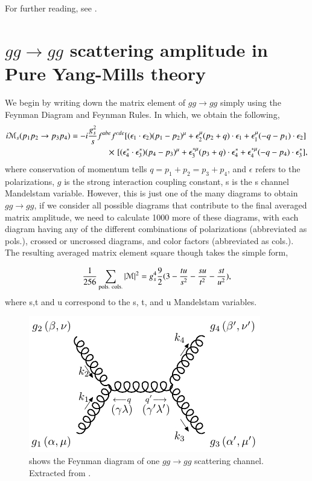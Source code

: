 \documentclass{article}
\begin{document}
\begin{appendices}
  For further reading, see \cite{schwartz2014quantum}. 

\section{$gg \to gg$ scattering amplitude in Pure Yang-Mills theory}%
  \label{sec:$gg \to gg$ scattering amplitude in Pure Yang-Mills theory}
We begin by writing down the matrix element of $gg \to gg$ simply using the
   Feynman Diagram and Feynman Rules. In which, we obtain 
   the following, 
  \begin{align}
    \label{gg scatter}
    i\mathcal{M}_s (p_1 p_2 \to p_3 p_4) &= -i
    \frac{g^2_s}{s}f^{abe}f^{cde}[(\epsilon_1 \cdot
    \epsilon_2)(p_1 - p_2)^{\mu} + \epsilon^{\mu}_2(p_2 + q)\cdot
    \epsilon_1 + \epsilon^{\mu}_1 (-q - p_1) \cdot \epsilon_2]\\ 
    &\hspace{1.5cm} \cross [(\epsilon^{*}_4 \cdot \epsilon^{*}_3) (p_4
    - p_3)^{\mu} + \epsilon^{*\mu}_3 (p_3 + q) \cdot
    \epsilon^{*}_4 + \epsilon^{*\mu}_4(-q - p_4) \cdot
    \epsilon^{*}_3],  
  \end{align}
where conservation of momentum tells $ q = p_1 + p_2 = p_3 + p_4 $, and
$\epsilon$ refers to the polarizations, $g$ is the strong interaction
coupling constant, s is the s channel Mandelstam variable. 
However, this is just one of the many diagrams to obtain $gg \to gg$, if we
consider all possible diagrams that contribute to the final averaged
matrix amplitude, we need to calculate 1000 more of these diagrams,
with each diagram having any of the different combinations of
polarizations (abbreviated as pols.), crossed or uncrossed diagrams, and color
factors (abbreviated as cols.). 
The resulting averaged matrix element square though takes the simple form, 

\begin{align}
  \label{simple gg scattering}
  \frac{1}{256} \sum_{\textnormal{pols. cols.}} | \mathcal{M} |^2 = g^4_s
  \frac{9}{2} (3 - \frac{tu}{s^2} - \frac{su}{t^2} -
  \frac{st}{u^2}),
\end{align} where s,t and u correspond to the s, t, and u Mandelstam
variables.


   \begin{figure}[h!]
\begin{center}
  \includegraphics[scale=0.5]{Figures/gg_scatter.jpg}
\end{center}
\caption{shows the Feynman diagram of one $gg \to gg$ scattering channel.
  Extracted from \cite{griffiths2020introduction}.}
\label{fig: gg scatter}
\end{figure}


\end{appendices}
\end{document}
